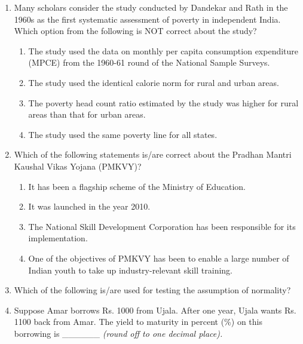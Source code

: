 \documentclass[12pt]{article}
\theoremstyle{remark}
\begin{document}
\begin{enumerate}
\begin{enumerate}
\end{enumerate}
\hfill{}
\item  Many scholars consider the study conducted by Dandekar and Rath in the 1960s as the first systematic assessment of poverty in independent India. Which option from the following is NOT correct about the study? 
\begin{enumerate} 
\item  The study used the data on monthly per capita consumption expenditure (MPCE) from the 1960-61 round of the National Sample Surveys. 
\item  The study used the identical calorie norm for rural and urban areas. 
\item  The poverty head count ratio estimated by the study was higher for rural areas than that for urban areas. 
\item  The study used the same poverty line for all states. 
\end{enumerate}
\hfill{}
\item  Which of the following statements is/are correct about the Pradhan Mantri Kaushal Vikas Yojana (PMKVY)? 
\begin{enumerate} 
\item  It has been a flagship scheme of the Ministry of Education. 
\item  It was launched in the year 2010. 
\item  The National Skill Development Corporation has been responsible for its implementation. 
\item  One of the objectives of PMKVY has been to enable a large number of Indian youth to take up industry-relevant skill training. 
 \end{enumerate}
\hfill{}
\item Which of the following is/are used for testing the assumption of normality? \\
\begin{enumerate}  \end{enumerate}
\hfill{}
\item Suppose Amar borrows Rs. 1000 from Ujala. After one year, Ujala wants Rs. 1100 back from Amar. The yield to maturity in percent (\%) on this borrowing is \_\_\_\_\_\_ \textit{(round off to one decimal place).} 

\end{enumerate}
\end{document}
